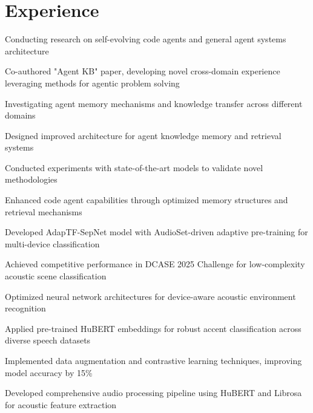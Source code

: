 \documentclass[]{deedy-resume-reversed}
\begin{document}

\section{Experience}
\begin{tightemize}
\item Conducting research on self-evolving code agents and general agent systems architecture
\item Co-authored "Agent KB" paper, developing novel cross-domain experience leveraging methods for agentic problem solving
\item Investigating agent memory mechanisms and knowledge transfer across different domains
\end{tightemize}
\sectionsep

\begin{tightemize}
\item Designed improved architecture for agent knowledge memory and retrieval systems
\item Conducted experiments with state-of-the-art models to validate novel methodologies
\item Enhanced code agent capabilities through optimized memory structures and retrieval mechanisms
\end{tightemize}
\sectionsep

\begin{tightemize}
\item Developed AdapTF-SepNet model with AudioSet-driven adaptive pre-training for multi-device classification
\item Achieved competitive performance in DCASE 2025 Challenge for low-complexity acoustic scene classification
\item Optimized neural network architectures for device-aware acoustic environment recognition
\end{tightemize}
\sectionsep

\begin{tightemize}
\item Applied pre-trained HuBERT embeddings for robust accent classification across diverse speech datasets
\item Implemented data augmentation and contrastive learning techniques, improving model accuracy by 15\%
\item Developed comprehensive audio processing pipeline using HuBERT and Librosa for acoustic feature extraction
\end{tightemize}
\sectionsep
\end{document}
